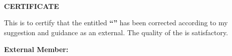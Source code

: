 %

\clearpage
\thispagestyle{fancy}
{}

\begin{center}
{\fontsize{11}{13}\selectfont \universitymotto}\\[4pt]
\ruetlogobwbox{0.85in}\\[8pt]
{\fontsize{16}{19}\selectfont \textbf{\departmentname}}\\[2pt]
{\fontsize{16}{19}\selectfont \textbf{\universityname}}
\end{center}

\vspace{0.5in}

\begin{center}
{\fontsize{16}{19}\selectfont \textbf{CERTIFICATE}}
\end{center}

\vspace{0.15in}

This is to certify that the \MakeLowercase{\worktype} entitled
\textbf{``\thesistitle''} has been corrected according to my suggestion and
guidance as an external. The quality of the \MakeLowercase{\worktype} is
satisfactory.

\vspace{0.9in}

\noindent\textbf{External Member:}

\vspace{0.35in}

\noindent
\signaturedots\\
\textbf{\externalname}\\
\externaldesignation\\
\externaldepartment\\
\externaluniversity

\clearpage
